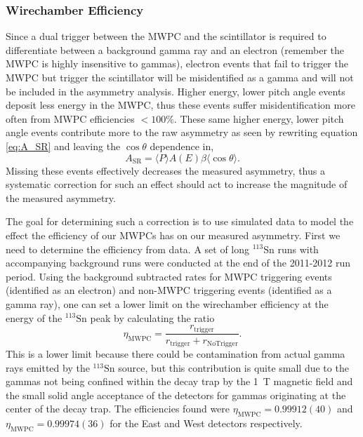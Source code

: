 \subsubsection{Wirechamber Efficiency} \label{sssec:mwpcEff}

Since a dual trigger between the MWPC and the scintillator is required to differentiate between
a background gamma ray and an electron (remember the MWPC is highly insensitive to gammas),
electron events that fail to
trigger the MWPC but trigger the scintillator will be misidentified as a gamma and will not
be included in the asymmetry analysis. Higher energy, lower pitch angle events deposit less
energy in the MWPC, thus these events suffer misidentification more often
from MWPC efficiencies $<100\%$. These same
higher energy, lower pitch angle events contribute more to the
raw asymmetry as seen by rewriting equation \ref{eq:A_SR}
and leaving the $\cos\theta$ dependence in,
%
\begin{equation}
  A_{\mathrm{SR}}=\langle P \rangle A(E) \beta \langle \cos\theta \rangle.
\end{equation}
%
\noindent Missing these events effectively decreases the measured asymmetry, thus a systematic
correction for such an effect
should act to increase the magnitude of the measured asymmetry.

The goal for determining such a correction is to use simulated data to model the effect
the efficiency of our MWPCs has on our measured asymmetry. First we need to determine
the efficiency from data. A set of long $^{113}\mathrm{Sn}$ runs with accompanying background runs
were conducted at the end of the 2011-2012 run period.
Using the background subtracted rates for MWPC triggering events (identified as an electron)
and non-MWPC triggering events (identified as a gamma ray), one can set
a lower limit on the wirechamber efficiency at the energy of the $^{113}\mathrm{Sn}$ peak
by calculating the ratio
%
\begin{equation}
  \eta_{\mathrm{MWPC}} = \frac{r_{\mathrm{trigger}}}{r_{\mathrm{trigger}}+r_{\mathrm{NoTrigger}}}.
\end{equation}
%
\noindent This is a lower limit because there could be contamination from actual gamma
rays emitted by the $^{113}\mathrm{Sn}$ source, but this contribution is quite small due
to the gammas not being confined within
the decay trap by the 1~T magnetic field and the small solid angle acceptance of the detectors
for gammas originating at the center of the decay trap. The efficiencies found were
$\eta_{\mathrm{MWPC}}=0.99912(40)$ and $\eta_{\mathrm{MWPC}}=0.99974(36)$ for the East and West
detectors respectively. 

